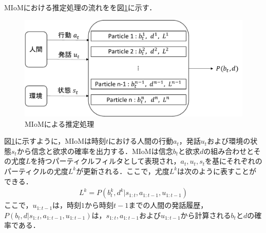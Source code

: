 \par
MIoMにおける推定処理の流れをを図\ref{fig:sys_arc}に示す．
\begin{figure}[htbp]
  \begin{center}
    \includegraphics[scale=0.75]{./bt1.pdf}
    \caption{MIoMによる推定処理}
    \label{fig:sys_arc}
  \end{center}
\end{figure}
図\ref{fig:sys_arc}に示すように，MIoMは時刻$t$における人間の行動$a_t$，発話$u_t$および環境の状態$s_t$から信念と欲求の確率を出力する．MIoMは信念$b_t$と欲求$d$の組み合わせとその尤度$L$を持つパーティクルフィルタとして表現され，$a_t,u_t,s_t$を基にそれぞれのパーティクルの尤度$L^k$が更新される．ここで，尤度$L^k$は次のように表すことができる．
\begin{equation}
  \begin{split}
  \label{pf}
  L^k=P(b_t^k,d^k|s_{1:t},a_{1:t-1},u_{1:t-1})
  \end{split}
\end{equation}
ここで，$u_{1:t-1}$は，時刻$1$から時刻$t-1$までの人間の発話履歴，$P(b_t,d|s_{1:t},a_{1:t-1},u_{1:t-1})$は，$s_{1:t},a_{1:t-1}およびu_{1:t-1}$から計算される$b_t$と$d$の確率である．

